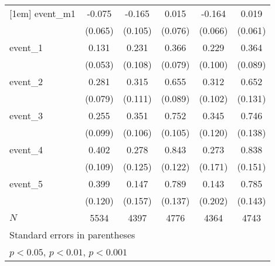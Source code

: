 {\begin{tabular}{l*{5}{c}}
[1em]
event\_m1    &      -0.075         &      -0.165         &       0.015         &      -0.164\sym{*}  &       0.019         \\
            &     (0.065)         &     (0.105)         &     (0.076)         &     (0.066)         &     (0.061)         \\
[1em]
event\_1     &       0.131\sym{*}  &       0.231\sym{*}  &       0.366\sym{***}&       0.229\sym{*}  &       0.364\sym{***}\\
            &     (0.053)         &     (0.108)         &     (0.079)         &     (0.100)         &     (0.089)         \\
[1em]
event\_2     &       0.281\sym{***}&       0.315\sym{**} &       0.655\sym{***}&       0.312\sym{**} &       0.652\sym{***}\\
            &     (0.079)         &     (0.111)         &     (0.089)         &     (0.102)         &     (0.131)         \\
[1em]
event\_3     &       0.255\sym{**} &       0.351\sym{***}&       0.752\sym{***}&       0.345\sym{**} &       0.746\sym{***}\\
            &     (0.099)         &     (0.106)         &     (0.105)         &     (0.120)         &     (0.138)         \\
[1em]
event\_4     &       0.402\sym{***}&       0.278\sym{*}  &       0.843\sym{***}&       0.273         &       0.838\sym{***}\\
            &     (0.109)         &     (0.125)         &     (0.122)         &     (0.171)         &     (0.151)         \\
[1em]
event\_5     &       0.399\sym{***}&       0.147         &       0.789\sym{***}&       0.143         &       0.785\sym{***}\\
            &     (0.120)         &     (0.157)         &     (0.137)         &     (0.202)         &     (0.143)         \\
\hline
\(N\)       &        5534         &        4397         &        4776         &        4364         &        4743         \\
\hline\hline
\multicolumn{6}{l}{\footnotesize Standard errors in parentheses}\\
\multicolumn{6}{l}{\footnotesize \sym{*} \(p<0.05\), \sym{**} \(p<0.01\), \sym{***} \(p<0.001\)}\\
\end{tabular}
}
